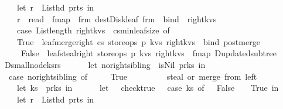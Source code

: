 \begin{isabellebody}
\ \ \ \ \ \ let\ r\ {\isacharequal}\ List{\isachardot}hd\ {\isacharparenleft}p{\isacharbar}{\isachargreater}r{\isacharunderscore}ts{}{\isacharparenright}\ in\isanewline
\ \ \ \ \ \ r\ {\isacharbar}{\isachargreater}\ read\ {\isacharbar}{\isachargreater}\ fmap\ {\isacharparenleft}{\isacharpercent}\ frm{\isachardot}\ dest{\isacharunderscore}Disk{\isacharunderscore}leaf\ frm{\isacharparenright}\ {\isacharbar}{\isachargreater}\ bind\ {\isacharparenleft}{\isacharpercent}\ right{\isacharunderscore}kvs{\isachardot}\ \isanewline
\ \ \ \ \ \ case\ List{\isachardot}length\ right{\isacharunderscore}kvs\ {\isacharequal}\ cs{\isacharbar}{\isachargreater}min{\isacharunderscore}leaf{\isacharunderscore}size\ of\isanewline
\ \ \ \ \ \ True\ {\isasymRightarrow}\ leaf{\isacharunderscore}merge{\isacharunderscore}right\ cs\ store{\isacharunderscore}ops\ p\ kvs\ right{\isacharunderscore}kvs\ {\isacharbar}{\isachargreater}\ bind\ post{\isacharunderscore}merge\isanewline
\ \ \ \ \ \ {\isacharbar}\ False\ {\isasymRightarrow}\ leaf{\isacharunderscore}steal{\isacharunderscore}right\ store{\isacharunderscore}ops\ p\ kvs\ right{\isacharunderscore}kvs\ {\isacharbar}{\isachargreater}\ fmap\ D{\isacharunderscore}updated{\isacharunderscore}subtree{\isacharparenright}{\isacharparenright}{\isacharparenright}\isanewline
\ \ {\isacharbar}\ D{\isacharunderscore}small{\isacharunderscore}node{\isacharparenleft}ks{\isacharcomma}rs{\isacharparenright}\ {\isasymRightarrow}\ {\isacharparenleft}\isanewline
\ \ \ \ let\ no{\isacharunderscore}right{\isacharunderscore}sibling\ {\isacharequal}\ is{\isacharunderscore}Nil{\isacharprime}\ {\isacharparenleft}p{\isacharbar}{\isachargreater}r{\isacharunderscore}ks{}{\isacharparenright}\ in\isanewline
\ \ \ \ case\ no{\isacharunderscore}right{\isacharunderscore}sibling\ of\ \isanewline
\ \ \ \ True\ {\isasymRightarrow}\ {\isacharparenleft}\isanewline
\ \ \ \ \ \ {\isacharparenleft}{\isacharasterisk}\ steal\ or\ merge\ from\ left\ {\isacharasterisk}{\isacharparenright}\isanewline
\ \ \ \ \ \ let\ ks{}\ {\isacharequal}\ p{\isacharbar}{\isachargreater}r{\isacharunderscore}ks{}\ in\isanewline
\ \ \ \ \ \ let\ {\isacharunderscore}\ {\isacharequal}\ check{\isacharunderscore}true\ {\isacharparenleft}{\isacharpercent}\ {\isacharunderscore}{\isachardot}\ case\ ks{}\ of\ {\isacharbrackleft}{\isacharbrackright}\ {\isasymRightarrow}\ False\ {\isacharbar}\ {\isacharunderscore}\ {\isasymRightarrow}\ True{\isacharparenright}\ in\isanewline
\ \ \ \ \ \ let\ r\ {\isacharequal}\ List{\isachardot}hd\ {\isacharparenleft}p{\isacharbar}{\isachargreater}r{\isacharunderscore}ts{}{\isacharparenright}\ in\isanewline

\end{isabellebody}
